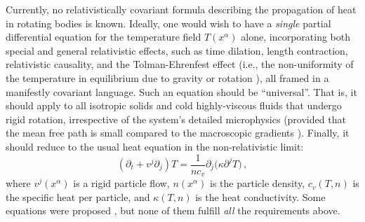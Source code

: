 \documentclass[a4paper, amsfonts, amssymb, amsmath, reprint, showkeys, nofootinbib, twoside, onecolumn,notitlepage]{revtex4-1}
\theoremstyle{definition}
\theoremstyle{theorem}
\begin{document}
Currently, no relativistically covariant formula describing the propagation of heat in rotating bodies is known. 
Ideally, one would wish to have a \textit{single} partial differential equation for the temperature field $T(x^\alpha)$ alone, incorporating both special and general relativistic effects, such as time dilation, length contraction, relativistic causality, and the Tolman-Ehrenfest effect (i.e., the non-uniformity of the temperature in equilibrium due to gravity or rotation \cite{TolmanLaw1930,landau5,cercignani_book,RovelliSmerlak2011,Santiago:2019aem}), all framed in a manifestly covariant language. Such an equation should be ``universal''. That is, it should apply to all isotropic solids \cite[\S 32]{landau7} and cold highly-viscous fluids \cite[\S 50]{landau6} that undergo rigid rotation, irrespective of the system's detailed microphysics (provided that the mean free path is small compared to the macroscopic gradients \cite{landau6,huang_book,Struchtrup2011Review,Grozdanov:2019kge,HellerHydrohedron2023jtd,GavassinoInfiniteOrded2024pgl}). Finally, it should reduce to the usual heat equation in the non-relativistic limit:
\vspace{-0.15cm}
\begin{equation}\label{newtonian}
(\partial_t {+}v^j \partial_j)T =\dfrac{1}{nc_v} \partial_j \big(\kappa \partial^j T\big) \, ,
\end{equation}
where $v^j(x^\alpha)$ is a rigid particle flow, $n(x^\alpha)$ is the particle density, $c_v(T,n)$ is the specific heat per particle, and $\kappa(T,n)$ is the heat conductivity. Some equations were proposed \cite{ThorneStellarStructure1967,lopez2011,Lander:2018cvq,Kim:2023lta}, but none of them fulfill \textit{all} the requirements above.
\end{document}
